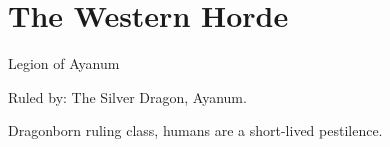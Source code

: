 \section{The Western Horde}

Legion of Ayanum

Ruled by: The Silver Dragon, Ayanum.

Dragonborn ruling class, humans are a short-lived pestilence.
